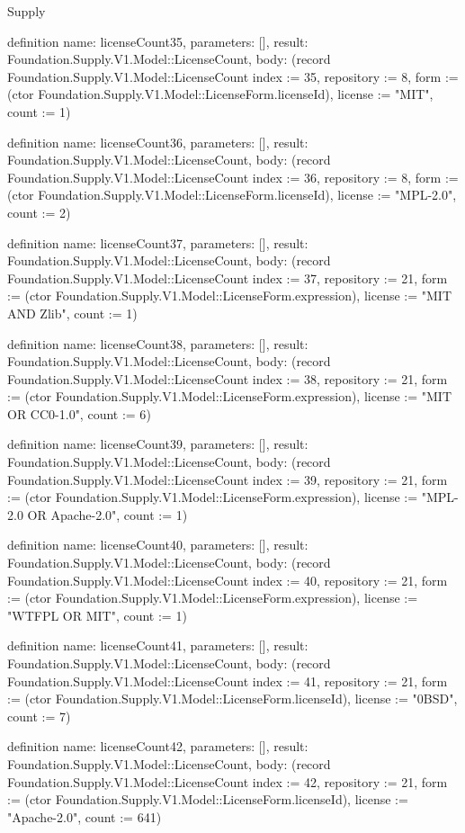 \begin{lexlean}{Supply}
\begin{semanticmodule}
definition{
  name: licenseCount35,
  parameters: [],
  result: Foundation.Supply.V1.Model::LicenseCount,
  body: (record Foundation.Supply.V1.Model::LicenseCount {index := 35, repository := 8, form := (ctor Foundation.Supply.V1.Model::LicenseForm.licenseId), license := "MIT", count := 1})
}

definition{
  name: licenseCount36,
  parameters: [],
  result: Foundation.Supply.V1.Model::LicenseCount,
  body: (record Foundation.Supply.V1.Model::LicenseCount {index := 36, repository := 8, form := (ctor Foundation.Supply.V1.Model::LicenseForm.licenseId), license := "MPL-2.0", count := 2})
}

definition{
  name: licenseCount37,
  parameters: [],
  result: Foundation.Supply.V1.Model::LicenseCount,
  body: (record Foundation.Supply.V1.Model::LicenseCount {index := 37, repository := 21, form := (ctor Foundation.Supply.V1.Model::LicenseForm.expression), license := "MIT AND Zlib", count := 1})
}

definition{
  name: licenseCount38,
  parameters: [],
  result: Foundation.Supply.V1.Model::LicenseCount,
  body: (record Foundation.Supply.V1.Model::LicenseCount {index := 38, repository := 21, form := (ctor Foundation.Supply.V1.Model::LicenseForm.expression), license := "MIT OR CC0-1.0", count := 6})
}

definition{
  name: licenseCount39,
  parameters: [],
  result: Foundation.Supply.V1.Model::LicenseCount,
  body: (record Foundation.Supply.V1.Model::LicenseCount {index := 39, repository := 21, form := (ctor Foundation.Supply.V1.Model::LicenseForm.expression), license := "MPL-2.0 OR Apache-2.0", count := 1})
}

definition{
  name: licenseCount40,
  parameters: [],
  result: Foundation.Supply.V1.Model::LicenseCount,
  body: (record Foundation.Supply.V1.Model::LicenseCount {index := 40, repository := 21, form := (ctor Foundation.Supply.V1.Model::LicenseForm.expression), license := "WTFPL OR MIT", count := 1})
}

definition{
  name: licenseCount41,
  parameters: [],
  result: Foundation.Supply.V1.Model::LicenseCount,
  body: (record Foundation.Supply.V1.Model::LicenseCount {index := 41, repository := 21, form := (ctor Foundation.Supply.V1.Model::LicenseForm.licenseId), license := "0BSD", count := 7})
}

definition{
  name: licenseCount42,
  parameters: [],
  result: Foundation.Supply.V1.Model::LicenseCount,
  body: (record Foundation.Supply.V1.Model::LicenseCount {index := 42, repository := 21, form := (ctor Foundation.Supply.V1.Model::LicenseForm.licenseId), license := "Apache-2.0", count := 641})
}


\end{semanticmodule}
\end{lexlean}
